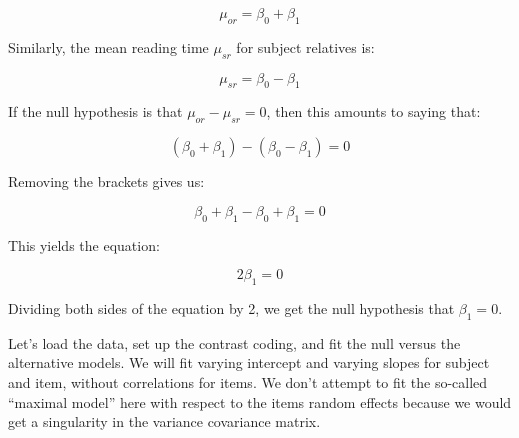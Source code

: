 \documentclass[12pt,]{krantz}
\begin{document}
\begin{equation}
\mu_{or}=\beta_0 + \beta_1
\end{equation}

Similarly, the mean reading time \(\mu_{sr}\) for subject relatives is:

\begin{equation}
\mu_{sr}=\beta_0 - \beta_1
\end{equation}

If the null hypothesis is that \(\mu_{or}-\mu_{sr}=0\), then this amounts to saying that:

\begin{equation}
(\beta_0 + \beta_1)-(\beta_0 - \beta_1)=0
\end{equation}

Removing the brackets gives us:

\begin{equation}
\beta_0 + \beta_1-\beta_0 + \beta_1 = 0
\end{equation}

This yields the equation:

\begin{equation}
2\beta_1= 0
\end{equation}

Dividing both sides of the equation by 2, we get the null hypothesis that \(\beta_1=0\).

Let's load the data, set up the contrast coding, and fit the null versus the alternative models. We will fit varying intercept and varying slopes for subject and item, without correlations for items. We don't attempt to fit the so-called ``maximal model'' here with respect to the items random effects because we would get a singularity in the variance covariance matrix.
\end{document}
